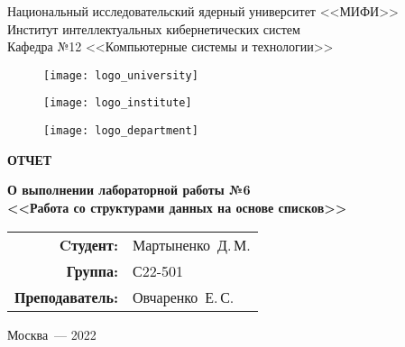 \begin{titlepage}
  \begin{center}
    \begin{large}
      Национальный исследовательский ядерный университет <<МИФИ>> \\
      \vspace{0.25cm}
      Институт интеллектуальных кибернетических систем \\
      \vspace{0.25cm}
      Кафедра №12 <<Компьютерные системы и технологии>>
    \end{large}

    \vspace*{1cm}

    \begin{figure}[H]
      \centering
      \begin{minipage}[c]{0.3\textwidth}
        \texttt{[image: logo\_university]}
      \end{minipage}
      \hfill
      \begin{minipage}[c]{0.3\textwidth}
        \texttt{[image: logo\_institute]}
      \end{minipage}
      \hfill
      \begin{minipage}[c]{0.3\textwidth}
        \texttt{[image: logo\_department]}
      \end{minipage}
    \end{figure}

    \vspace{4cm}

    \begin{huge}
      \textbf{ОТЧЕТ}
    \end{huge}

    \begin{large}
      \textbf{О выполнении лабораторной работы №6 \\
        <<Работа со структурами данных на основе списков>>}
    \end{large}
    
    \vfill
    
    \begin{flushright}
      \begin{tabular}{ r l }
        \textbf{Cтудент:} & Мартыненко~Д.\,М. \\ 
        \textbf{Группа:} & С22-501 \\  
        \textbf{Преподаватель:} & Овчаренко~Е.\,С. \\
      \end{tabular}
    \end{flushright}
            
    Москва~--- 2022
  \end{center}
\end{titlepage}
